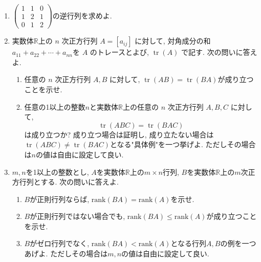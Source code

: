 \documentclass[dvipdfmx,a4paper,11pt]{article}
\newcommand{\R}{\mathbb{R}}
\theoremstyle{definition}
\begin{document}
\begin{enumerate}[label={\Large \textbf{第}\arabic*\textbf{問}.}]
\item  
$
 \begin{pmatrix}
 1&1&0\\
 1&2&1\\
 0&1&2
 \end{pmatrix}
 $の逆行列を求めよ. 
 
  \item 
 実数体$\R$上の \(n\) 次正方行列 \(A=[a_{ij}]\) に対して, 対角成分の和
\(
a_{11}+a_{22}+\cdots+a_{nn}
\)を \(A\) のトレースとよび, \(\operatorname{tr}(A)\) で記す.
次の問いに答えよ. 
 \begin{enumerate}[label=(\arabic*)]
 \setlength{\parskip}{0cm} %
  \setlength{\itemsep}{0cm}
  \item 任意の \(n\) 次正方行列 \(A,B\) に対して,
\(
\operatorname{tr}(AB)=\operatorname{tr}(BA)
\)が成り立つことを示せ. 
\item
 任意の1以上の整数$n$と実数体$\R$上の任意の \(n\) 次正方行列 \(A,B ,C\) に対して,
\[
\operatorname{tr}(ABC)=\operatorname{tr}(BAC)
\]は成り立つか? 成り立つ場合は証明し, 成り立たない場合は$\operatorname{tr}(ABC)\neq \operatorname{tr}(BAC)$となる"具体例"を一つ挙げよ. ただしその場合は$n$の値は自由に設定して良い.
\end{enumerate}



 \newpage
 


   \item $m, n$を1以上の整数とし, $A$を実数体$\R$上の$m \times n$行列, $B$を実数体$\R$上の$m$次正方行列とする. 次の問いに答えよ.
 \begin{enumerate}[label=(\arabic*)]
 \setlength{\parskip}{0cm} %
  \setlength{\itemsep}{0cm}
  \item $B$が正則行列ならば,  $\mathrm{rank}(BA) = \mathrm{rank}(A)$を示せ.
    \item $B$が正則行列ではない場合でも, $\mathrm{rank}(BA) \le \mathrm{rank}(A)$が成り立つことを示せ. 
  \item $B$がゼロ行列でなく, $\mathrm{rank}(BA) <\mathrm{rank}(A)$となる行列$A, B$の例を一つあげよ. ただしその場合は$m,n$の値は自由に設定して良い.
    \end{enumerate}
    

\end{enumerate}
\end{document}
